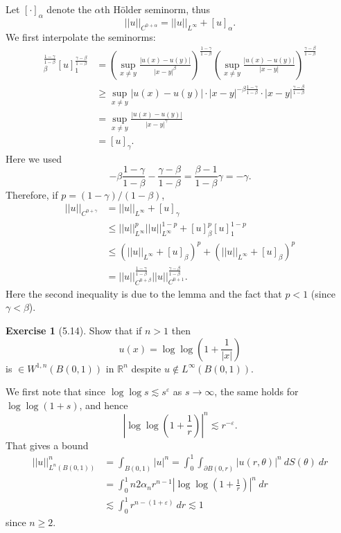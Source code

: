 \documentclass[10pt]{article}
\newcommand{\RR}{\mathbb{R}}
\theoremstyle{definition}
\newtheorem{exer}{Exercise}
\begin{document}
Let $[\cdot]_\alpha$ denote the $\alpha$th H\"older seminorm, thus
$$||u||_{C^{0+\alpha}} = ||u||_{L^\infty} + [u]_\alpha.$$
We first interpolate the seminorms:
\begin{align*}
[u]_\beta^{\frac{1-\gamma}{1-\beta}} [u]_1^{\frac{\gamma-\beta}{1-\beta}}
&= \left(\sup_{x \neq y} \frac{|u(x) - u(y)|}{|x - y|^\beta}\right)^{\frac{1-\gamma}{1-\beta}}\left(\sup_{x \neq y} \frac{|u(x) - u(y)|}{|x - y|}\right)^{\frac{\gamma-\beta}{1-\beta}}\\
&\geq \sup_{x \neq y} |u(x) - u(y)| \cdot |x - y|^{-\beta\frac{1-\gamma}{1-\beta}} \cdot |x - y|^{\frac{\gamma - \beta}{1 - \beta}}\\
&= \sup_{x \neq y} \frac{|u(x) - u(y)|}{|x - y|^\gamma}\\
&= [u]_\gamma.
\end{align*}
Here we used
$$-\beta\frac{1 - \gamma}{1 - \beta} - \frac{\gamma - \beta}{1 - \beta} = \frac{\beta - 1}{1 - \beta}\gamma = -\gamma.$$
Therefore, if $p = (1-\gamma)/(1 - \beta)$,
\begin{align*}
||u||_{C^{0+\gamma}} &= ||u||_{L^\infty} + [u]_\gamma \\
&\leq ||u||_{L^\infty}^p ||u||_{L^\infty}^{1 - p} +
[u]_\beta^p [u]_1^{1 - p}\\
&\leq (||u||_{L^\infty} + [u]_\beta)^p + (||u||_{L^\infty} + [u]_\beta)^p\\
&= ||u||_{C^{0+\beta}}^{\frac{1-\gamma}{1-\beta}} ||u||_{C^{0+1}}^{\frac{\gamma-\beta}{1-\beta}}.
\end{align*}
Here the second inequality is due to the lemma and the fact that $p < 1$ (since $\gamma < \beta$).


\begin{exer}[5.14]
Show that if $n > 1$ then
$$u(x) = \log \log \left(1 + \frac{1}{|x|} \right)$$
is $\in W^{1,n}(B(0, 1))$ in $\RR^n$ despite $u \notin L^\infty(B(0, 1))$.
\end{exer}

We first note that since $\log \log s \lesssim s^\varepsilon$ as $s \to \infty$, the same holds for $\log \log (1+s)$, and hence
$$\left|\log \log \left(1 + \frac{1}{r}\right)\right|^n \lesssim r^{-\varepsilon}.$$
That gives a bound
\begin{align*}
||u||_{L^n(B(0,1))}^n &= \int_{B(0, 1)} |u|^n = \int_0^1 \int_{\partial B(0, r)} |u(r, \theta)|^n ~dS(\theta) ~dr\\
&= \int_0^1 n2\alpha_n r^{n-1} \left|\log \log \left(1 + \frac{1}{r}\right)\right|^n ~dr\\
&\lesssim \int_0^1 r^{n-(1 + \varepsilon)} ~dr \lesssim 1
\end{align*}
since $n \geq 2$.
\end{document}
